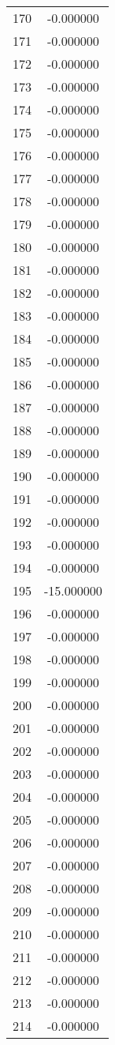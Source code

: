 \documentclass[12pt]{article}
\begin{document}
\begin{longtable}{@{}cc@{}}
170 & -0.000000 \\
171 & -0.000000 \\
172 & -0.000000 \\
173 & -0.000000 \\
174 & -0.000000 \\
175 & -0.000000 \\
176 & -0.000000 \\
177 & -0.000000 \\
178 & -0.000000 \\
179 & -0.000000 \\
180 & -0.000000 \\
181 & -0.000000 \\
182 & -0.000000 \\
183 & -0.000000 \\
184 & -0.000000 \\
185 & -0.000000 \\
186 & -0.000000 \\
187 & -0.000000 \\
188 & -0.000000 \\
189 & -0.000000 \\
190 & -0.000000 \\
191 & -0.000000 \\
192 & -0.000000 \\
193 & -0.000000 \\
194 & -0.000000 \\
195 & -15.000000 \\
196 & -0.000000 \\
197 & -0.000000 \\
198 & -0.000000 \\
199 & -0.000000 \\
200 & -0.000000 \\
201 & -0.000000 \\
202 & -0.000000 \\
203 & -0.000000 \\
204 & -0.000000 \\
205 & -0.000000 \\
206 & -0.000000 \\
207 & -0.000000 \\
208 & -0.000000 \\
209 & -0.000000 \\
210 & -0.000000 \\
211 & -0.000000 \\
212 & -0.000000 \\
213 & -0.000000 \\
214 & -0.000000 \\

\end{longtable}
\end{document}

